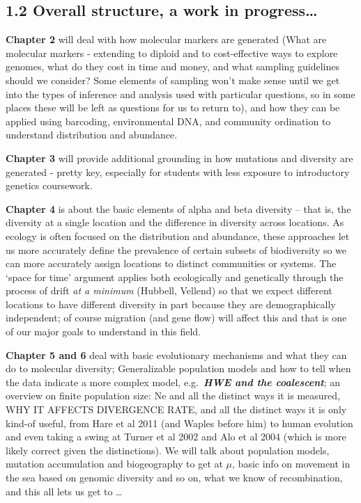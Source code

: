 \documentclass[
]{article}
\begin{document}
\hypertarget{overall-structure-a-work-in-progress}{%
\subsection{1.2 Overall structure, a work in
progress\ldots{}}\label{overall-structure-a-work-in-progress}}

\textbf{Chapter 2} will deal with how molecular markers are generated
(What are molecular markers - extending to diploid and to cost-effective
ways to explore genomes, what do they cost in time and money, and what
sampling guidelines should we consider? Some elements of sampling won't
make sense until we get into the types of inference and analysis used
with particular questions, so in some places these will be left as
questions for us to return to), and how they can be applied using
barcoding, environmental DNA, and community ordination to understand
distribution and abundance.

\textbf{Chapter 3} will provide additional grounding in how mutations
and diversity are generated - pretty key, especially for students with
less exposure to introductory genetics coursework.

\textbf{Chapter 4} is about the basic elements of alpha and beta
diversity -- that is, the diversity at a single location and the
difference in diversity across locations. As ecology is often focused on
the distribution and abundance, these approaches let us more accurately
define the prevalence of certain subsets of biodiversity so we can more
accurately assign locations to distinct communities or systems. The
`space for time' argument applies both ecologically and genetically
through the process of drift \emph{at a minimum} (Hubbell, Vellend) so
that we expect different locations to have different diversity in part
because they are demographically independent; of course migration (and
gene flow) will affect this and that is one of our major goals to
understand in this field.

\textbf{Chapter 5 and 6} deal with basic evolutionary mechanisms and
what they can do to molecular diversity; Generalizable population models
and how to tell when the data indicate a more complex model,
e.g.~\textbf{\emph{HWE and the coalescent}}; an overview on finite
population size: Ne and all the distinct ways it is measured, WHY IT
AFFECTS DIVERGENCE RATE, and all the distinct ways it is only kind-of
useful, from Hare et al 2011 (and Waples before him) to human evolution
and even taking a swing at Turner et al 2002 and Alo et al 2004 (which
is more likely correct given the distinctions). We will talk about
population models, mutation accumulation and biogeography to get at
\(\mu\), basic info on movement in the sea based on genomic diversity
and so on, what we know of recombination, and this all lets us get to
\ldots{}
\end{document}

